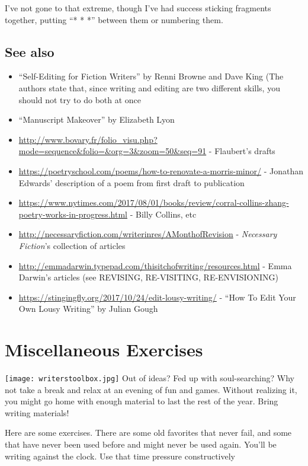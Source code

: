 \documentclass[11pt]{article}
\begin{document}
I've not gone to that extreme, though I've had success sticking fragments together, putting ``* * *'' between them or numbering them.


\subsection*{See also}
\begin{itemize}
\item ``Self-Editing for Fiction Writers'' by Renni Browne and Dave King (The authors state that, since writing and editing are two different skills, you should not try to do both at once
\item ``Manuscript Makeover'' by Elizabeth Lyon
\item 
\url{http://www.bovary.fr/folio_visu.php?mode=sequence&folio=&org=3&zoom=50&seq=91} - Flaubert's drafts
\item \url{https://poetryschool.com/poems/how-to-renovate-a-morris-minor/} - Jonathan Edwards' description of a poem from first draft to publication
\item \url{https://www.nytimes.com/2017/08/01/books/review/corral-collins-zhang-poetry-works-in-progress.html} - Billy Collins, etc
\item \url{http://necessaryfiction.com/writerinres/AMonthofRevision} - \textit{Necessary Fiction}'s collection of articles
\item \url{http://emmadarwin.typepad.com/thisitchofwriting/resources.html} - Emma Darwin's articles (see REVISING, RE-VISITING, RE-ENVISIONING)
\item \url{https://stingingfly.org/2017/10/24/edit-lousy-writing/} - ``How To Edit Your Own Lousy Writing'' by Julian Gough 
\end{itemize}

\newpage
\section{Miscellaneous Exercises}

\texttt{[image: writerstoolbox.jpg]}
Out of ideas? Fed up with soul-searching? Why not take a break and relax at an evening of fun and games. Without realizing it, you might go home with enough material to last the rest of the year. Bring writing materials!

Here are some exercises. There are some old favorites that never fail, and some that have never been used before and might never be used again. You'll be writing against the clock. Use that time pressure constructively 
\end{document}
